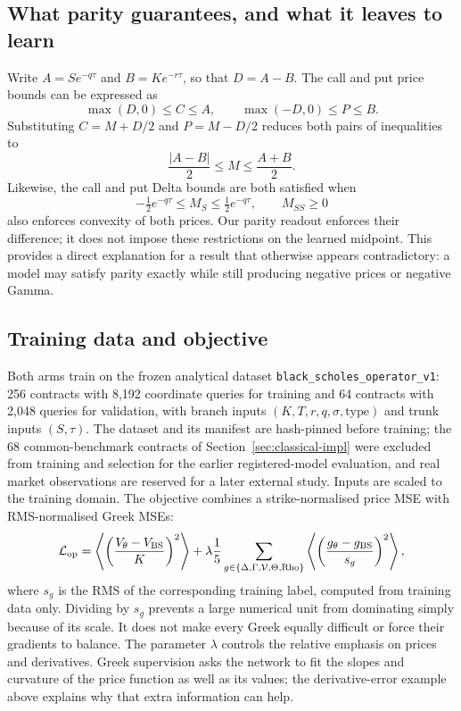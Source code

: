 \documentclass[11pt,a4paper]{article}
\begin{document}
\subsection{What parity guarantees, and what it leaves to learn}
Write $A=Se^{-q\tau}$ and $B=Ke^{-r\tau}$, so that $D=A-B$. The call and put price bounds can be expressed as
\begin{equation}
\max(D,0)\le C\le A,\qquad \max(-D,0)\le P\le B.
\end{equation}
Substituting $C=M+D/2$ and $P=M-D/2$ reduces both pairs of inequalities to
\begin{equation}
\frac{|A-B|}{2}\le M\le\frac{A+B}{2}.
\label{eq:midpoint-bounds}
\end{equation}
Likewise, the call and put Delta bounds are both satisfied when
\begin{equation}
-\tfrac12e^{-q\tau}\le M_S\le\tfrac12e^{-q\tau},
\qquad M_{SS}\ge0
\label{eq:midpoint-shape}
\end{equation}
also enforces convexity of both prices. Our parity readout enforces their difference; it does not impose these restrictions on the learned midpoint. This provides a direct explanation for a result that otherwise appears contradictory: a model may satisfy parity exactly while still producing negative prices or negative Gamma.

\subsection{Training data and objective}
\label{sec:deeponet-data}

Both arms train on the frozen analytical dataset \texttt{black\_scholes\_operator\_v1}: 256 contracts with 8,192 coordinate queries for training and 64 contracts with 2,048 queries for validation, with branch inputs $(K,T,r,q,\sigma,\mathrm{type})$ and trunk inputs $(S,\tau)$. The dataset and its manifest are hash-pinned before training; the 68 common-benchmark contracts of Section~\ref{sec:classical-impl} were excluded from training and selection for the earlier registered-model evaluation, and real market observations are reserved for a later external study. Inputs are scaled to the training domain. The objective combines a strike-normalised price MSE with RMS-normalised Greek MSEs:
\begin{equation}
\mathcal L_{\rm op}=\left\langle\left(\frac{V_\theta-V_{\rm BS}}{K}\right)^2\right\rangle
+\lambda\frac{1}{5}\sum_{g\in\{\Delta,\Gamma,\mathcal V,\Theta,\mathrm{Rho}\}}
\left\langle\left(\frac{g_\theta-g_{\rm BS}}{s_g}\right)^2\right\rangle,
\label{eq:deep-loss}
\end{equation}
where $s_g$ is the RMS of the corresponding training label, computed from training data only. Dividing by $s_g$ prevents a large numerical unit from dominating simply because of its scale. It does not make every Greek equally difficult or force their gradients to balance. The parameter $\lambda$ controls the relative emphasis on prices and derivatives. Greek supervision asks the network to fit the slopes and curvature of the price function as well as its values; the derivative-error example above explains why that extra information can help.
\end{document}
